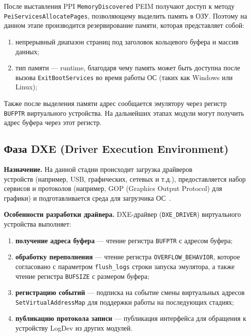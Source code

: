 После выставления PPI \texttt{MemoryDiscovered} PEIM получают доступ к
методу \texttt{PeiServicesAllocatePages}, позволяющему выделить память в ОЗУ. Поэтому на данном этапе производится резервирование памяти, которая представляет собой:
\begin{enumerate}
    \item непрерывный диапазон страниц под заголовок кольцевого буфера и массив данных;
    \item тип памяти --- runtime, благодаря чему память может быть доступна после вызова \texttt{ExitBootServices} во время работы ОС (таких как Windows или Linux);
\end{enumerate}

Также после выделения памяти адрес сообщается эмулятору через регистр \texttt{BUFPTR} виртуального устройства. На дальнейших этапах модули могут получить адрес буфера через этот регистр.

\subsection{Фаза DXE (Driver Execution Environment)}

\textbf{Назначение.} На данной стадии происходит загрузка драйверов\\
устройств (например, USB, графических, сетевых и т.д.), предоставляется набор сервисов и протоколов (например, GOP (Graphics Output Protocol) для графики) и подготавливается среда для загрузчика ОС~\cite{edk2,uefi_driver_guide}.

\textbf{Особенности разработки драйвера.} DXE-драйвер (\texttt{DXE\_DRIVER}) виртуального устройства выполняет:
\begin{enumerate}
    \item \textbf{получение адреса буфера} --- чтение регистра \texttt{BUFPTR} с адресом буфера;
    \item \textbf{обработку переполнения} --- чтение регистра \texttt{OVERFLOW\_BEHAVIOR}, которое согласовано с параметром \texttt{flush\_logs} строки запуска эмулятора, а также чтение регистра \texttt{BUFSIZE} с размером буфера;
    \item \textbf{регистрацию событий} --- подписка на событие смены виртуальных адресов \texttt{SetVirtualAddressMap} для поддержки работы на последующих стадиях;
    \item \textbf{публикацию протокола записи} --- публикация интерфейса для обращения к устройству LogDev из других модулей.
\end{enumerate}

